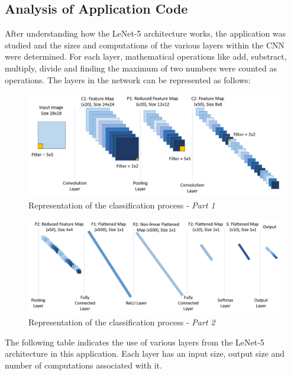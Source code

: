 \subsection{Analysis of Application Code}
\label{sect5_3_1}
After understanding how the LeNet-5 architecture works, the application was studied and the sizes and computations of the various layers within the CNN were determined. For each layer, mathematical operations like add, substract, multiply, divide and finding the maximum of two numbers were counted as operations.\newline\newline
The layers in the network can be represented as follows:
\begin{figure}[h!]
\centering
\includegraphics[width=13cm]{figures/Papaa_LeNet5-1.png}
\caption{Representation of the classification process - \textit{Part 1}}
\label{fig:cnn14}
\end{figure}

\begin{figure}[h!]
\centering
\includegraphics[width=\linewidth]{figures/Papaa_LeNet5-2.png}
\caption{Representation of the classification process - \textit{Part 2}}
\label{fig:cnn16}
\end{figure}

The following table indicates the use of various layers from the LeNet-5 architecture in this application. Each layer has an input size, output size and number of computations associated with it.\newline

